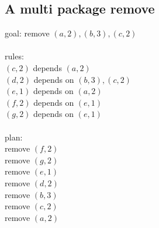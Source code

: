 \documentclass[a4paper,11pt]{article}
\begin{document}
\subsection{A multi package remove}

goal: remove $(a,2), (b,3), (c,2)$\\
\\
rules:\\
  $(c,2)$ depends $(a,2)$\\
  $(d,2)$ depends on $(b,3), (c,2)$\\
  $(e,1)$ depends on $(a,2)$\\
  $(f,2)$ depends on $(e,1)$\\
  $(g,2)$ depends on $(e,1)$\\\\
plan:\\
  remove $(f,2)$\\
  remove $(g,2)$\\
  remove $(e,1)$\\
  remove $(d,2)$\\
  remove $(b,3)$\\
  remove $(c,2)$\\
  remove $(a,2)$\\
\end{document}
